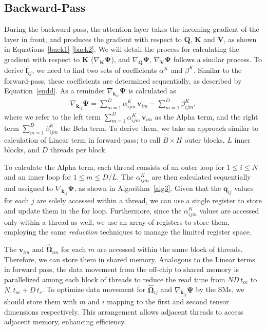 \subsection{Backward-Pass}
During the backward-pass, the attention layer takes the incoming gradient of the layer in front, and produces the gradient with respect to $\mathbf{Q}$, $\mathbf{K}$ and $\mathbf{V}$, as shown in Equations~\ref{back1}-\ref{back2}. We will detail the process for calculating the gradient with respect to $\mathbf{K}$ ($\nabla_{\mathbf{K}}\mathbf{\Psi}$), and $\nabla_{\mathbf{Q}}\mathbf{\Psi},\,\nabla_{\mathbf{V}}\mathbf{\Psi}$ follows a similar process. To derive $\mathbf{f}_{ij}$, we need to find two sets of coefficients $\alpha^{K}$ and $\beta^{K}$. Similar to the forward-pass, these coefficients are determined sequentially, as described by Equation~\ref{endd}. As a reminder $\nabla_{\mathbf{k}_{ir}}\mathbf{\Psi}$ is calculated as
\begin{gather}
    \nabla_{\mathbf{k}_{ij}}\mathbf{\Psi} = \sum_{m=1}^{D}\alpha_{ijm}^{K}\,\mathbf{v}_{im} - \sum_{m=1}^{D}\beta_{ijm}^{K},
\end{gather}
where we refer to the left term $\sum_{m=1}^{D}\alpha_{ijm}^{K}\,\mathbf{v}_{im}$ as the Alpha term, and the right term $\sum_{m=1}^{D}\beta_{ijm}^{K}$ the Beta term. To derive them, we take an approach similar to calculation of Linear term in forward-pass; to call $B\times H$ outer blocks, $L$ inner blocks, and $D$ threads per block.

\par To calculate the Alpha term, each thread consists of an outer loop for $1\leq i\leq N$ and an inner loop for $1\leq m\leq D/L$. The $\alpha_{ijm}^{K}$ are then calculated sequentially and assigned to $\nabla_{\mathbf{k}_{ij}}\mathbf{\Psi}$, as shown in Algorithm~\ref{alg3}. Given that the $\mathbf{q}_{ij}$ values for each $j$ are solely accessed within a thread, we can use a single register to store and update them in the for loop. Furthermore, since the $\alpha_{ijm}^{K}$ values are accessed only within a thread as well, we use an array of registers to store them, employing the same \textit{reduction} techniques to manage the limited register space.

\par The $\mathbf{v}_{im}$ and $\mathbf{\hat{\Omega}}_{im}$ for each $m$ are accessed within the same block of threads. Therefore, we can store them in shared memory. Analogous to the Linear terms in forward pass, the data movement from the off-chip to shared memory is parallelized among each block of threads to reduce the read time from $ND\,t_{oc}$ to $N,t_{oc} + D\,t_{s}$. To optimize data movement for $\mathbf{\hat{\Omega}}_{ij}$ and $\nabla_{\mathbf{k}_{ij}}\mathbf{\Psi}$ by the SMs, we should store them with $m$ and $i$ mapping to the first and second tensor dimensions respectively. This arrangement allows adjacent threads to access adjacent memory, enhancing efficiency.


